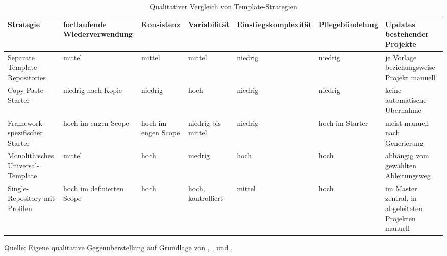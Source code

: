 \begin{table}[htbp]
  \centering
  \scriptsize
  \setlength{\tabcolsep}{3pt}
  \renewcommand{\arraystretch}{1.08}
  \caption{Qualitativer Vergleich von Template-Strategien}
  \label{tab:template-strategy-comparison}
  \begin{tabularx}{\textwidth}{@{}>{\raggedright\arraybackslash}p{}>{\centering\arraybackslash}p{}>{\centering\arraybackslash}p{}>{\centering\arraybackslash}p{}>{\centering\arraybackslash}p{}>{\centering\arraybackslash}p{}>{\raggedright\arraybackslash}X@{}}
    \toprule
    \textbf{Strategie} & \textbf{fortlaufende Wiederverwendung} &
      \textbf{Konsistenz} & \textbf{Variabilität} &
      \textbf{Einstiegs\-komplexität} & \textbf{Pflege\-bündelung} &
      \textbf{Updates bestehender Projekte} \\
    \midrule
    Separate Template-Repositories & mittel & mittel & mittel & niedrig &
      niedrig & je Vorlage beziehungsweise Projekt manuell \\
    Copy-Paste-Starter & niedrig nach Kopie & niedrig & hoch & niedrig &
      niedrig & keine automatische Übernahme \\
    Framework-spezifischer Starter & hoch im engen Scope & hoch im engen Scope
      & niedrig bis mittel & niedrig & hoch im Starter & meist manuell nach
      Generierung \\
    Monolithisches Universal-Template & mittel & hoch & niedrig & hoch & hoch
      & abhängig vom gewählten Ableitungsweg \\
    Single-Repository mit Profilen & hoch im definierten Scope & hoch & hoch,
      kontrolliert & mittel & hoch & im Master zentral, in abgeleiteten
      Projekten manuell \\
    \bottomrule
  \end{tabularx}
  \smallskip
  {\footnotesize Quelle: Eigene qualitative Gegenüberstellung auf Grundlage
  von \textcite{krueger1992software-reuse},
  \textcite{clements2001software-product-lines},
  \textcite{github2026repository-template} und \textcite{vite2026guide}.\par}
\end{table}
